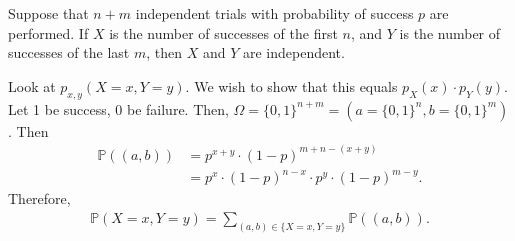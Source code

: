 
\begin{eg}
	Suppose that \( n+m \) independent trials with probability of success \( p \) are performed. If \( X \) is the number of successes of the first \( n \), and \( Y \) is the number of successes of the last \( m \), then \( X \) and \( Y \) are independent.
\end{eg}
\begin{explanation}
	Look at \( p_{x,y}(X=x,Y=y) \). We wish to show that this equals \( p_X(x) \cdot p_Y(y) \). Let 1 be success, 0 be failure. Then, \( \Omega = \{0,1\} ^{n+m} = (a = \{0,1\} ^{n}  , b=\{0,1\} ^{m}  )  \). Then 
	\begin{align*}
		\mathbb{P}((a, b)) &= p^{x+y} \cdot (1-p)^{m + n - (x + y)}  \\
		&= p^{x}\cdot (1-p)^{n-x} \cdot p^{y}\cdot (1-p)^{m-y}
	.\end{align*}
	Therefore, 
	\begin{align*}
		\mathbb{P}(X=x,Y=y) = \sum_{(a,b) \in \{X=x,Y=y\}  } \mathbb{P}((a,b))
	.\end{align*}
\end{explanation}
